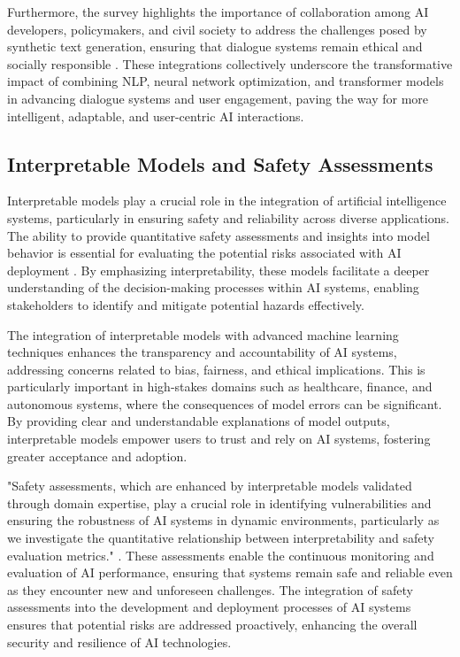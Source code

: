 Furthermore, the survey highlights the importance of collaboration among AI developers, policymakers, and civil society to address the challenges posed by synthetic text generation, ensuring that dialogue systems remain ethical and socially responsible \cite{mcguffie2020radicalizationrisksgpt3advanced}. These integrations collectively underscore the transformative impact of combining NLP, neural network optimization, and transformer models in advancing dialogue systems and user engagement, paving the way for more intelligent, adaptable, and user-centric AI interactions.


\subsection{Interpretable Models and Safety Assessments} \label{subsec:Interpretable Models and Safety Assessments}

Interpretable models play a crucial role in the integration of artificial intelligence systems, particularly in ensuring safety and reliability across diverse applications. The ability to provide quantitative safety assessments and insights into model behavior is essential for evaluating the potential risks associated with AI deployment \cite{wei2022safetyinterpretablemachinelearning}. By emphasizing interpretability, these models facilitate a deeper understanding of the decision-making processes within AI systems, enabling stakeholders to identify and mitigate potential hazards effectively.



The integration of interpretable models with advanced machine learning techniques enhances the transparency and accountability of AI systems, addressing concerns related to bias, fairness, and ethical implications. This is particularly important in high-stakes domains such as healthcare, finance, and autonomous systems, where the consequences of model errors can be significant. By providing clear and understandable explanations of model outputs, interpretable models empower users to trust and rely on AI systems, fostering greater acceptance and adoption.



"Safety assessments, which are enhanced by interpretable models validated through domain expertise, play a crucial role in identifying vulnerabilities and ensuring the robustness of AI systems in dynamic environments, particularly as we investigate the quantitative relationship between interpretability and safety evaluation metrics." \cite{wei2022safetyinterpretablemachinelearning}. These assessments enable the continuous monitoring and evaluation of AI performance, ensuring that systems remain safe and reliable even as they encounter new and unforeseen challenges. The integration of safety assessments into the development and deployment processes of AI systems ensures that potential risks are addressed proactively, enhancing the overall security and resilience of AI technologies.





